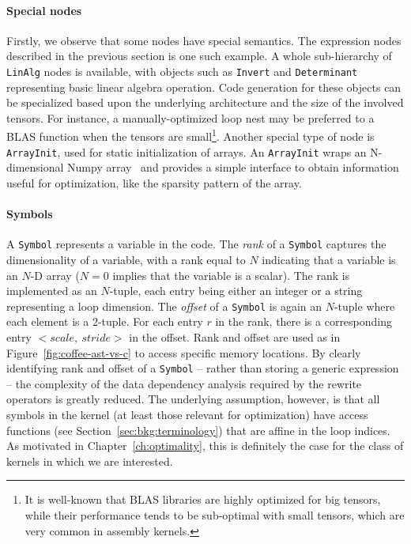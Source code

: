 \paragraph{Special nodes}
Firstly, we observe that some nodes have special semantics. The expression nodes described in the previous section is one such example. A whole sub-hierarchy of \texttt{LinAlg} nodes is available, with objects such as \texttt{Invert} and \texttt{Determinant} representing basic linear algebra operation. Code generation for these objects can be specialized based upon the underlying architecture and the size of the involved tensors. For instance, a manually-optimized loop nest may be preferred to a BLAS function when the tensors are small\footnote{It is well-known that BLAS libraries are highly optimized for big tensors, while their performance tends to be sub-optimal with small tensors, which are very common in assembly kernels.}. Another special type of node is \texttt{ArrayInit}, used for static initialization of arrays. An \texttt{ArrayInit} wraps an N-dimensional Numpy array~\cite{Numpy} and provides a simple interface to obtain information useful for optimization, like the sparsity pattern of the array. 

\paragraph{Symbols}
A \texttt{Symbol} represents a variable in the code. The \textit{rank} of a \texttt{Symbol} captures the dimensionality of a variable, with a rank equal to $N$ indicating that a variable is an $N$-D array ($N=0$ implies that the variable is a scalar). The rank is implemented as an $N$-tuple, each entry being either an integer or a string representing a loop dimension. The \textit{offset} of a \texttt{Symbol} is again an $N$-tuple where each element is a 2-tuple. For each entry $r$ in the rank, there is a corresponding entry ${<}scale,\ stride{>}$ in the offset. Rank and offset are used as in Figure~\ref{fig:coffee-ast-vs-c} to access specific memory locations. By clearly identifying rank and offset of a \texttt{Symbol} -- rather than storing a generic expression -- the complexity of the data dependency analysis required by the rewrite operators is greatly reduced. The underlying assumption, however, is that all symbols in the kernel (at least those relevant for optimization) have access functions (see Section~\ref{sec:bkg:terminology}) that are affine in the loop indices. As motivated in Chapter~\ref{ch:optimality}, this is definitely the case for the class of kernels in which we are interested.

